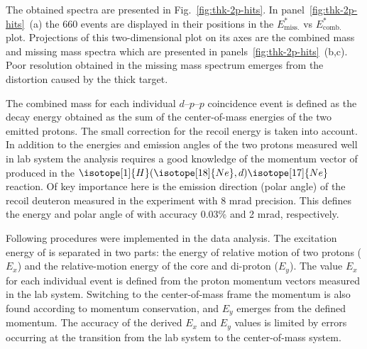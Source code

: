 \documentclass[superscriptaddress,showpacs,showkeys,twoside,floatfix,twocolumn]
{revtex4-1}
\begin{document}
The obtained spectra are presented in Fig.~\ref{fig:thk-2p-hits}.
In panel~\ref{fig:thk-2p-hits}~(a) the 660 events are displayed
in their positions in the $E^*_\mathrm{miss.}$ vs $E^*_\mathrm{comb.}$ plot.
Projections of this two-dimensional plot on its axes are the combined mass
and missing mass spectra which are presented in panels~\ref{fig:thk-2p-hits}~(b,c).
Poor resolution obtained in the missing mass spectrum emerges
from the distortion caused by the thick target.

The combined mass for each individual $d–p–p$ coincidence event is defined as
the  decay energy obtained as the sum of
the center-of-mass energies of the two emitted protons.
The small correction for the  recoil energy is taken into account.
In addition to the energies and emission angles of the two protons
measured well in lab system the analysis requires a good knowledge of
the momentum vector of  produced in the
$\isotope[1]{H}(\isotope[18]{Ne},d)\isotope[17]{Ne}$ reaction.
Of key importance here is the emission direction (polar angle)
of the recoil deuteron measured in the experiment with 8 mrad precision.
This defines the energy and polar angle of 
with accuracy 0.03\% and 2 mrad, respectively.

Following procedures were implemented in the data analysis.
The excitation energy of  is separated in two parts:
the energy of relative motion of two protons ($E_x$) and
the relative-motion energy of the core and di-proton ($E_y$).
The value $E_x$ for each individual event is defined from
the proton momentum vectors measured in the lab system.
Switching to the  center-of-mass frame
the  momentum is also found according to momentum conservation,
and $E_y$ emerges from the defined  momentum.
The accuracy of the derived $E_x$ and $E_y$ values is limited
by errors occurring at the transition from the lab system to the center-of-mass system.
\end{document}
